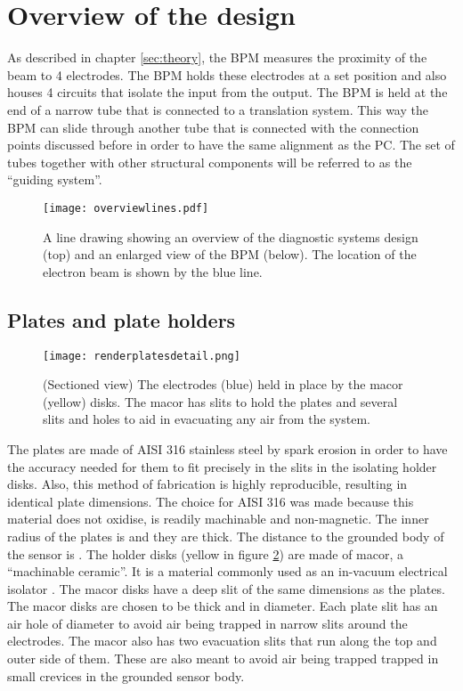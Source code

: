 \section{Overview of the design}
As described in chapter \ref{sec:theory}, the BPM measures the proximity of the beam to 4 electrodes. The BPM holds these electrodes at a set position and also houses 4 circuits that isolate the input from the output. The BPM is held at the end of a narrow tube that is connected to a translation system. This way the BPM can slide through another tube that is connected with the connection points discussed before in order to have the same alignment as the PC. The set of tubes together with other structural components will be referred to as the ``guiding system''.

\begin{figure}[h]
 \centering
 \texttt{[image: overviewlines.pdf]}
 \caption{A line drawing showing an overview of the diagnostic systems design (top) and an enlarged view of the BPM (below). The location of the electron beam is shown by the blue line.}
 \label{fig:designoverview}
\end{figure}

\subsection{Plates and plate holders}

\begin{figure}[H]
 \centering
 \texttt{[image: renderplatesdetail.png]}
 \caption{(Sectioned view) The electrodes (blue) held in place by the macor (yellow) disks. The macor has slits to hold the plates and several slits and holes to aid in evacuating any air from the system.}
 \label{fig:plates}
\end{figure}

The plates are made of AISI 316 stainless steel by spark erosion in order to have the accuracy needed for them to fit precisely in the slits in the isolating holder disks. Also, this method of fabrication is highly reproducible, resulting in identical plate dimensions. The choice for AISI 316 was made because this material does not oxidise, is readily machinable and non-magnetic. 
The inner radius of the plates is  and they are  thick. The distance to the grounded body of the sensor is .
The holder disks (yellow in figure \ref{fig:plates}) are made of macor, a ``machinable ceramic''. It is a material commonly used as an in-vacuum electrical isolator . The macor disks have a  deep slit of the same dimensions as the plates. The macor disks are chosen to be  thick and  in diameter. Each plate slit has an air hole of  diameter to avoid air being trapped in narrow slits around the electrodes. The macor also has two evacuation slits that run along the top and outer side of them. These are also meant to avoid air being trapped trapped in small crevices in the grounded sensor body.

